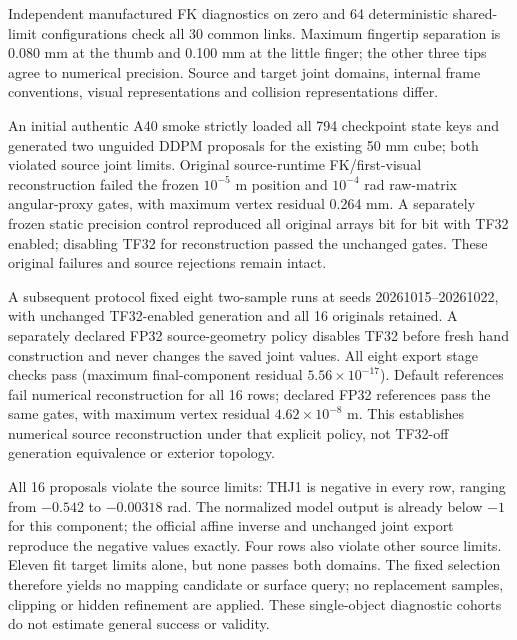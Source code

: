 \documentclass[10pt,letterpaper]{article}
\begin{document}
Independent manufactured FK diagnostics on zero and 64 deterministic shared-limit
configurations check all 30 common links. Maximum fingertip separation is
0.080 mm at the thumb and 0.100 mm at the little finger; the other three tips
agree to numerical precision. Source and target joint domains, internal frame
conventions, visual representations and collision representations differ.

An initial authentic A40 smoke strictly loaded all 794 checkpoint state keys
and generated two unguided DDPM proposals for the existing 50 mm cube; both
violated source joint limits. Original source-runtime FK/first-visual
reconstruction failed the frozen $10^{-5}$ m position and $10^{-4}$ rad
raw-matrix angular-proxy gates, with maximum vertex residual 0.264 mm.
A separately frozen static precision control reproduced all original arrays
bit for bit with TF32 enabled; disabling TF32 for reconstruction passed the
unchanged gates. These original failures and source rejections remain intact.

A subsequent protocol fixed eight two-sample runs at seeds 20261015--20261022,
with unchanged TF32-enabled generation and all 16 originals retained.
A separately declared FP32 source-geometry policy disables TF32 before fresh
hand construction and never changes the saved joint values. All eight export
stage checks pass (maximum final-component residual $5.56\times10^{-17}$).
Default references fail numerical reconstruction for all 16 rows; declared FP32
references pass the same gates, with maximum vertex residual
$4.62\times10^{-8}$ m. This establishes numerical source reconstruction under
that explicit policy, not TF32-off generation equivalence or exterior topology.

All 16 proposals violate the source limits: THJ1 is negative in every row,
ranging from $-0.542$ to $-0.00318$ rad. The normalized model output is already
below $-1$ for this component; the official affine inverse and unchanged joint
export reproduce the negative values exactly. Four rows also violate other
source limits. Eleven fit target limits alone, but none passes both domains.
The fixed selection therefore yields no mapping candidate or surface query;
no replacement samples, clipping or hidden refinement are applied. These
single-object diagnostic cohorts do not estimate general success or validity.
\end{document}
